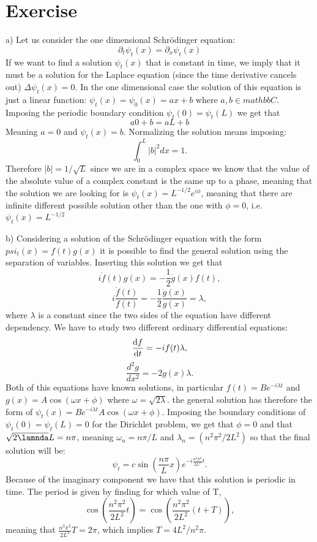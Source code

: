 \documentclass{article}
\begin{document}
\section{Exercise}
a) Let us consider the one dimensional Schrödinger equation:
\[
    \partial_t \psi_t(x) = \partial_x \psi_t(x)
\]
If we want to find a solution $\psi_t(x)$ that is constant in time, we imply that it must be a solution for the Laplace equation (since the time derivative cancels out) $\Delta \psi_t(x) = 0$. In the one dimensional case the solution of this equation is just a linear function: $\psi_t(x) = \psi_0(x) = ax+b$ where $a, b \in mathbb C$. Imposing the periodic boundary condition $\psi_t(0) = \psi_t(L)$ we get that
\[
     a0 + b = aL +b 
\]
Meaning $a= 0$ and $\psi_t (x) = b$. Normalizing the solution means imposing:
\[
    \int_0^L |b|^2 dx = 1.
\]
Therefore $|b| = 1/\sqrt{L}$ since we are in a complex space we know that the value of the absolute value of a complex constant is the same up to a phase, meaning that the solution we are looking for is $\psi_t (x) = L^{-1/2} e^{i \phi}$, meaning that there are infinite different possible solution other than the one with $\phi = 0$, i.e. $\psi_t(x) = L^{-1/2}$

b) Considering a solution of the Schrödinger equation with the form $psi_t (x) = f(t)g(x)$ it is possible to find the general solution using the separation of variables. Inserting this solution we get that 
\[
    i\dot f(t)g(x)= - \frac{1}{2} \ddot g(x)f(t),
\]
\[
    i \frac{\dot f (t)}{f(t)} = -\frac{1}{2}\frac{\ddot g(x)}{g(x)} = \lambda,
\]
where $\lambda$ is a constant since the two sides of the equation have different dependency. We have to study two different ordinary differential equations:
\[
    \odv{f}{t} =-i f(t) \lambda,
\]
\[
    \frac{d^2 g}{dx^2} = - 2 g(x) \lambda.
\]
Both of this equations have known solutions, in particular $f(t) = B e^{-i\lambda t}$ and $g(x) = A \cos{(\omega x + \phi)}$ where $\omega = \sqrt{2 \lambda}$. the general solution has therefore the form of $\psi_t (x) = Be^{-i\lambda t}A \cos{(\omega x + \phi)}$. Imposing the boundary conditions of $\psi_t (0) = \psi_t(L) = 0$ for the Dirichlet problem, we get that $\phi = 0$ and that $\sqrt{2\lamnda} L = n \pi$, meaning $\omega_n = n\pi/L$ and $\lambda_n = (n^2 \pi^2/2L^2)$ so that the final solution will be:
\[
     \psi_t = c \sin{\left(\frac{n\pi}{L}x\right)} e^{-i\frac{n^2\pi^2}{2L^2}t}.
\]
Because of the imaginary component we have that this solution is periodic in time. The period is given by finding for which value of T,
\[
    \cos{\left(\frac{n^2\pi^2}{2L^2}t\right)} = \cos{\left(\frac{n^2\pi^2}{2L^2}(t+T)\right)},
\]
meaning that $\frac{n^2\pi^2}{2L^2}T = 2 \pi$, which implies $T = 4L^2/n^2 \pi$.
\end{document}

